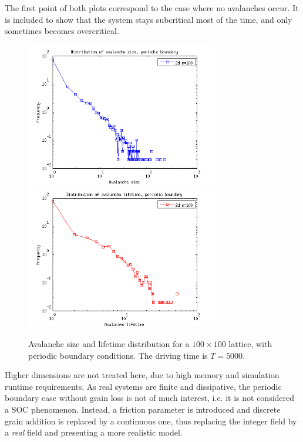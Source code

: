 The first point of both plots correspond to the case where no avalanches occur. It is included to show that the system stays subcritical most of the time, and only sometimes becomes overcritical. 


\begin{figure} 
\begin{center}
\includegraphics[width=0.75\textwidth]{results/sp.png} \\
\includegraphics[width=0.75\textwidth]{results/tp.png} 
\caption{Avalanche size and lifetime distribution for a $100\times100$ lattice, with periodic boundary conditions. 
The driving time is $T=5000$.  }
\label{sp}
\end{center}
\end{figure} 

Higher dimensions are not treated here, due to high memory and simulation runtime requirements. As real systems are finite and dissipative, the periodic boundary case without grain loss is not of much interest, i.e. it is not considered a SOC phenomenon. Instead, a friction parameter is introduced and discrete grain addition is replaced by a continuous one, thus replacing the integer field by a \emph{real} field and presenting a more realistic model.

